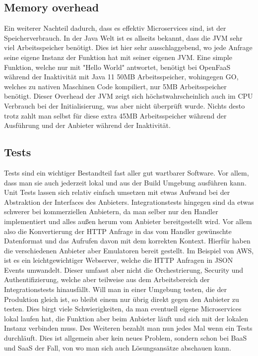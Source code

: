 \documentclass[12pt, a4paper]{article}
\begin{document}
\subsection{Memory overhead}
Ein weiterer Nachteil dadurch, dass es effektiv Microservices sind, ist der Speicherverbrauch.
In der Java Welt ist es allseits bekannt, dass die \ac{JVM} sehr viel Arbeitsspeicher benötigt.
Dies ist hier sehr ausschlaggebend, wo jede Anfrage seine eigene Instanz der Funktion hat mit seiner eigenen \ac{JVM}.
Eine simple Funktion, welche nur mit "Hello World" antwortet, benötigt bei OpenFaaS während der Inaktivität mit Java 11 50MB Arbeitsspeicher, wohingegen GO, welches zu nativen Maschinen Code kompiliert, nur 5MB Arbeitsspeicher benötigt.
\newline
Dieser Overhead der JVM zeigt sich höchstwahrscheinlich auch im CPU Verbrauch bei der Initialisierung, was aber nicht überprüft wurde.
Nichts desto trotz zahlt man selbst für diese extra 45MB Arbeitsspeicher während der Ausführung und der Anbieter während der Inaktivität.

\subsection{Tests}
Tests sind ein wichtiger Bestandteil fast aller gut wartbarer Software.
Vor allem, dass man sie auch jederzeit lokal und aus der Build Umgebung ausführen kann.
Unit Tests lassen sich relativ einfach umsetzen mit etwas Aufwand bei der Abstraktion der Interfaces des Anbieters.
\newline
Integrationstests hingegen sind da etwas schwerer bei kommerziellen Anbietern, da man selber nur den Handler implementiert und alles außen herum vom Anbieter bereitgestellt wird.
Vor allem also die Konvertierung der HTTP Anfrage in das vom Handler gewünschte Datenformat und das Aufrufen davon mit dem korrekten Kontext.
Hierfür haben die verschiedenen Anbieter aber Emulatoren bereit gestellt.
Im Beispiel von AWS, ist es ein leichtgewichtiger Webserver, welche die HTTP Anfragen in JSON Events umwandelt\cite{aws_lambda_rie}.
Dieser umfasst aber nicht die Orchestrierung, Security und Authentifizierung, welche aber teilweise aus dem Arbeitsbereich der Integrationstests hinausfällt.
\newline
Will man in einer Umgebung testen, die der Produktion gleich ist, so bleibt einem nur übrig direkt gegen den Anbieter zu testen.
Dies birgt viele Schwierigkeiten, da man eventuell eigene Microservices lokal laufen hat, die Funktion aber beim Anbieter läuft und sich mit der lokalen Instanz verbinden muss.
Des Weiteren bezahlt man nun jedes Mal wenn ein Tests durchläuft.
\newline
Dies ist allgemein aber kein neues Problem, sondern schon bei \ac{BaaS} und \ac{SaaS} der Fall, von wo man sich auch Lösungsansätze abschauen kann.
\end{document}
